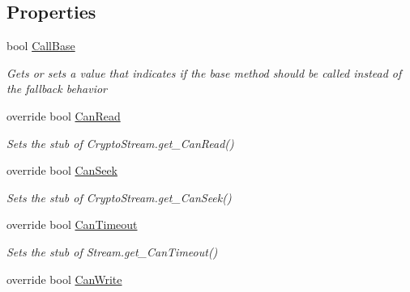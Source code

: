 \subsection*{Properties}
\begin{DoxyCompactItemize}
\item 
bool \hyperlink{class_system_1_1_security_1_1_cryptography_1_1_fakes_1_1_stub_crypto_stream_a8b70e0dc6d435aadc6b20940d06ebe8e}{Call\-Base}
\begin{DoxyCompactList}\small\item\em Gets or sets a value that indicates if the base method should be called instead of the fallback behavior\end{DoxyCompactList}\item 
override bool \hyperlink{class_system_1_1_security_1_1_cryptography_1_1_fakes_1_1_stub_crypto_stream_a14c24180a3a6fa93515ead554dc5bffb}{Can\-Read}
\begin{DoxyCompactList}\small\item\em Sets the stub of Crypto\-Stream.\-get\-\_\-\-Can\-Read()\end{DoxyCompactList}\item 
override bool \hyperlink{class_system_1_1_security_1_1_cryptography_1_1_fakes_1_1_stub_crypto_stream_ae03b46a2e1e5e9d65c7196188e6486ff}{Can\-Seek}
\begin{DoxyCompactList}\small\item\em Sets the stub of Crypto\-Stream.\-get\-\_\-\-Can\-Seek()\end{DoxyCompactList}\item 
override bool \hyperlink{class_system_1_1_security_1_1_cryptography_1_1_fakes_1_1_stub_crypto_stream_a30be7bebf13643076d5d3fb25381bcc2}{Can\-Timeout}
\begin{DoxyCompactList}\small\item\em Sets the stub of Stream.\-get\-\_\-\-Can\-Timeout()\end{DoxyCompactList}\item 
override bool \hyperlink{class_system_1_1_security_1_1_cryptography_1_1_fakes_1_1_stub_crypto_stream_a3eb7799c91578bf45d6a55b384a5d8d5}{Can\-Write}

\end{DoxyCompactItemize}
